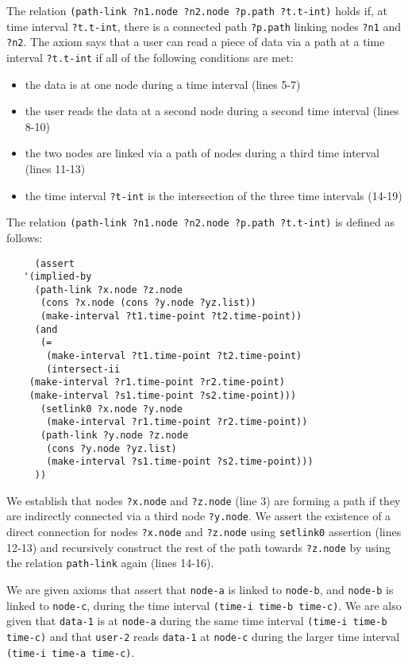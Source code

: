 The relation \verb'(path-link ?n1.node ?n2.node ?p.path ?t.t-int)' holds if, at time interval \verb'?t.t-int', there is a connected path \verb'?p.path' linking nodes \verb'?n1' and \verb'?n2'. 
The axiom says that a user can read a piece of data via a path at a time interval \verb'?t.t-int' if all of the following conditions are met:
\begin{itemize}
\item the data is at one node during a time interval (lines 5-7)
\item the user reads the data at a second node during a second time interval (lines 8-10)
\item the two nodes are linked via a path of nodes during a third time interval (lines 11-13)
\item the time interval \verb'?t-int' is the intersection of the three time intervals (14-19)
\end{itemize}

The relation \verb'(path-link ?n1.node ?n2.node ?p.path ?t.t-int)' is defined as follows:

\begin{lstlisting}
     (assert
   '(implied-by
     (path-link ?x.node ?z.node
      (cons ?x.node (cons ?y.node ?yz.list))
      (make-interval ?t1.time-point ?t2.time-point))
     (and
      (=
       (make-interval ?t1.time-point ?t2.time-point)
       (intersect-ii
	(make-interval ?r1.time-point ?r2.time-point)
	(make-interval ?s1.time-point ?s2.time-point)))
      (setlink0 ?x.node ?y.node
       (make-interval ?r1.time-point ?r2.time-point))
      (path-link ?y.node ?z.node
       (cons ?y.node ?yz.list)
       (make-interval ?s1.time-point ?s2.time-point)))
     ))
\end{lstlisting}

We establish that nodes \verb'?x.node'
and \verb'?z.node' (line 3) are forming a path if they are indirectly connected via a third node \verb'?y.node'. We assert the existence of a direct connection for nodes \verb'?x.node' and \verb'?z.node' using \verb'setlink0' assertion (lines 12-13) and recursively construct the rest of the path towards \verb'?z.node' by using the relation \verb'path-link' again (lines 14-16).

We are given axioms that assert that \verb'node-a' is linked to \verb'node-b', and \verb'node-b' is linked to \verb'node-c', during the time interval \verb'(time-i time-b time-c)'. We are also given that \verb'data-1' is at \verb'node-a' during the same time interval 
\verb'(time-i time-b time-c)' and that \verb'user-2' reads \verb'data-1' at \verb'node-c' during the larger time interval \verb'(time-i time-a time-c)'.  

